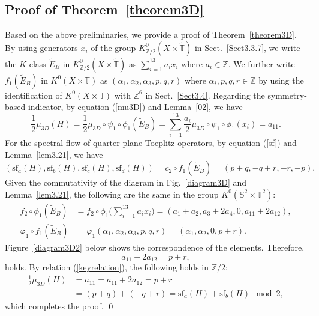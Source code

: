 \documentclass{amsart}
\theoremstyle{plain}
\theoremstyle{definition}
\theoremstyle{remark}
\newcommand{\Z}{\mathbb{Z}}
\newcommand{\T}{\mathbb{T}}
\newcommand{\SSS}{\mathbb{S}}
\newcommand{\tT}{\widetilde{\T}}
\newcommand{\eBloch}{\widetilde{E}_B}
\renewcommand{\sf}{\mathrm{sf}}
\begin{document}
\subsection{Proof of Theorem~\ref{theorem3D}}
\label{Sect3.5}
Based on the above preliminaries, we provide a proof of Theorem~\ref{theorem3D}.
By using generators $x_i$ of the group $K^0_{\Z/2}(X \times \tT)$ in Sect.~\ref{Sect3.3.7}, we write the $K$-class $\eBloch$ in $K^0_{\Z/2}(X \times \tT)$ as $\sum_{i=1}^{13}a_i x_i$ where $a_i \in \Z$.
We further write $f_1(\eBloch)$ in $K^0(X \times \T)$ as $(\alpha_1, \alpha_2, \alpha_3, p, q, r)$ where $\alpha_i, p, q, r \in \Z$ by using the identification of $K^0(X \times \T)$ with $\Z^6$ in Sect.~\ref{Sect3.4}.
Regarding the symmetry-based indicator, by equation (\ref{mu3D}) and Lemma~\ref{02}, we have
\begin{equation*}
	\frac{1}{2}\mu_{3D}(H) = \frac{1}{2} \mu_{3D} \circ \psi_1 \circ \phi_1 (\eBloch)
		 = \sum_{i=1}^{13}\frac{a_i}{2}\mu_{3D} \circ \psi_1 \circ \phi_1(x_i) = a_{11}.
\end{equation*}
For the spectral flow of quarter-plane Toeplitz operators, by equation (\ref{sf}) and Lemma~\ref{lem3.21}, we have
\begin{equation*}
	(\sf_a(H), \sf_b(H), \sf_c(H), \sf_d(H)) = c_2 \circ f_1 (\eBloch) = (p+q, -q+r, -r, -p).
\end{equation*}
Given the commutativity of the diagram in Fig.~\ref{diagram3D} and Lemma~\ref{lem3.21}, the following are the same in the group $K^0(\SSS^2 \times \T^2)$:
\vspace{-2mm}
\begin{align*}
	f_2 \circ \phi_1 (\eBloch) &= f_2 \circ \phi_1 \Big(\sum_{i=1}^{13}a_i x_i \Big) = (a_1+a_2, a_3+2a_4, 0, a_{11}+2a_{12} ), \\
	\varphi_1 \circ f_1 (\eBloch) &= \varphi_1(\alpha_1, \alpha_2, \alpha_3, p, q, r) = (\alpha_1, \alpha_2,0, p+r).
\end{align*}
Figure~\ref{diagram3D2} below shows the correspondence of the elements.
Therefore,
\begin{equation}
\label{keyrelation}
	a_{11}+2a_{12} = p+r,
\end{equation}
holds.
By relation (\ref{keyrelation}), the following holds in $\Z/2$:
\begin{equation*}
\label{keycomp}
\begin{aligned}
	\frac{1}{2}\mu_{3D}(H) &= a_{11} = a_{11} + 2a_{12} = p+r \\
	&= (p+q) + (-q+r) = \sf_a(H) + \sf_b(H) \mod 2,
\end{aligned}
\end{equation*}
which completes the proof.
\qed
\end{document}
